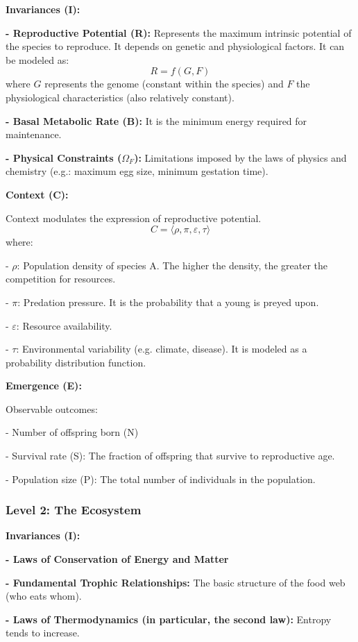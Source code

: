 \documentclass{article}
\begin{document}
\textbf{Invariances (I):}
 
\textbf{- Reproductive Potential (R):} Represents the maximum intrinsic potential of the species to reproduce. It depends on genetic and physiological factors. It can be modeled as:
$$ R = f(G, F) $$
where \(G\) represents the genome (constant within the species) and \(F\) the physiological characteristics (also relatively constant).

\textbf{- Basal Metabolic Rate (B):} It is the minimum energy required for maintenance.

\textbf{- Physical Constraints (\(\Omega_F\)):} Limitations imposed by the laws of physics and chemistry (e.g.: maximum egg size, minimum gestation time).
    
\bigskip
\noindent\textbf{Context (C):}

Context modulates the expression of reproductive potential.
$$ C = \langle \rho, \pi, \varepsilon, \tau \rangle $$
where:\par
- \(\rho\): Population density of species A. The higher the density, the greater the competition for resources.\par
- \(\pi\): Predation pressure. It is the probability that a young is preyed upon.\par
- \(\varepsilon\): Resource availability.\par
- \(\tau\): Environmental variability (e.g. climate, disease). It is modeled as a probability distribution function.\par
    
\bigskip
\noindent\textbf{Emergence (E):}

Observable outcomes:\par
- Number of offspring born (N)\par
- Survival rate (S): The fraction of offspring that survive to reproductive age.\par
- Population size (P): The total number of individuals in the population.\par

\subsubsection{Level 2: The Ecosystem}
\textbf{Invariances (I):}\par
\textbf{- Laws of Conservation of Energy and Matter}\par
\textbf{- Fundamental Trophic Relationships:} The basic structure of the food web (who eats whom).\par
\textbf{- Laws of Thermodynamics (in particular, the second law):} Entropy tends to increase.\par
\end{document}
